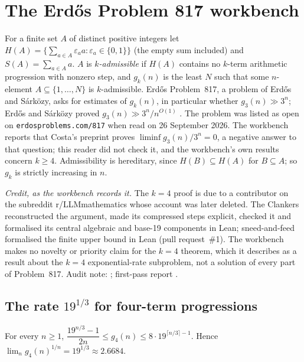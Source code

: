 \section{The Erdős Problem 817 workbench}\label{sec:ep817}

For a finite set $A$ of distinct positive integers let $H(A)=\{\sum_{a\in A}\varepsilon_aa:\varepsilon_a\in\{0,1\}\}$ (the empty sum included) and $S(A)=\sum_{a\in A}a$. $A$ is \emph{$k$-admissible} if $H(A)$ contains no $k$-term arithmetic progression with nonzero step, and $g_k(n)$ is the least $N$ such that some $n$-element $A\subseteq\{1,\dots,N\}$ is $k$-admissible. Erdős Problem~817, a problem of Erdős and Sárközy, asks for estimates of $g_k(n)$, in particular whether $g_3(n)\gg3^n$; Erdős and Sárközy proved $g_3(n)\gg3^n/n^{O(1)}$ \cite{ErdosSarkozy}. The problem was listed as open on \texttt{erdosproblems.com/817} when read on 26 September 2026. The workbench reports that Costa's preprint \cite{Costa} proves $\liminf g_3(n)/3^n=0$, a negative answer to that question; this reader did not check it, and the workbench's own results concern $k\ge4$.
Admissibility is hereditary, since $H(B)\subseteq H(A)$ for $B\subseteq A$; so $g_k$ is strictly increasing in $n$.

\emph{Credit, as the workbench records it.} The $k=4$ proof is due to a contributor on the subreddit r/LLMmathematics whose account was later deleted. The Clankers reconstructed the argument, made its compressed steps explicit, checked it and formalised its central algebraic and base-19 components in Lean; sneed-and-feed formalised the finite upper bound in Lean (pull request~\#1). The workbench makes no novelty or priority claim for the $k=4$ theorem, which it describes as a result about the $k=4$ exponential-rate subproblem, not a solution of every part of Problem~817.
Audit note: ; first-pass report .

\subsection{The rate \texorpdfstring{$19^{1/3}$}{19\^{}(1/3)} for four-term progressions}

\begin{theorem}\label{thm:ep817}
For every $n\ge1$, $\dfrac{19^{n/3}-1}{2n}\le g_4(n)\le8\cdot19^{\lceil n/3\rceil-1}$. Hence $\lim_n g_4(n)^{1/n}=19^{1/3}\approx2.6684$.
\end{theorem}

